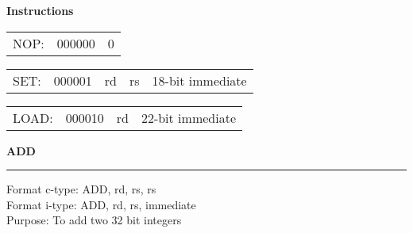 \documentclass{article}
\begin{document}
\begin{minipage}[t]{0.3\textwidth}
	\begin{center}
		\textbf{Instructions}
	\end{center}
\end{minipage}
\begin{minipage}[t]{110mm}
	\begin{tabular}{p{12mm}|C{15mm}|C{75.15mm}|}
		NOP: & 000000 & 0 \\ 
	\end{tabular} 
	
	\medskip

	\begin{tabular}{p{12mm}|C{15mm}|C{10mm}|C{10mm}|C{55.15mm}|}
		SET: & 000001 & rd & rs & 18-bit immediate \\
	\end{tabular}

	\medskip
	
	\begin{tabular}{p{12mm}|C{15mm}|C{10mm}|C{65.3mm}|}
		LOAD: & 000010 & rd & 22-bit immediate \\
	\end{tabular}
	

\end{minipage}

\pagebreak

\huge\textbf{ADD}\\
\noindent\rule{10cm}{0.4pt}
\normalsize

Format c-type: ADD, rd, rs, rs\\
Format i-type: ADD, rd, rs, immediate\\
Purpose: To add two 32 bit integers
\end{document}
